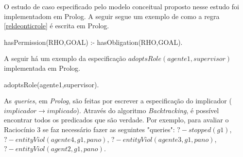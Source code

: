 O estudo de caso especificado pelo modelo conceitual proposto nesse estudo foi implementadom em Prolog. A seguir segue um exemplo de como a regra \ref{reldeonticrole} é escrita em Prolog.

hasPermission(RHO,GOAL) :- hasObligation(RHO,GOAL).

A seguir há um exemplo da especificação $adoptsRole(agente1,supervisor)$ implementada em Prolog.

adoptsRole(agente1,supervisor).

As \textit{queries}, em \textit{Prolog}, são feitas por escrever a especificação do implicador ($implicador \to implicado$). Através do algoritmo \textit{Backtracking}, é possível encontrar todos os predicados que são verdade. Por exemplo, para avaliar o Raciocínio 3 se faz necessário fazer as seguintes "queries": $? - stopped(g1)$, $? - entityViol(agente4,g1,pano)$, $? - entityViol(agente3,g1,pano)$, $? - entityViol(agent2,g1,pano)$. 